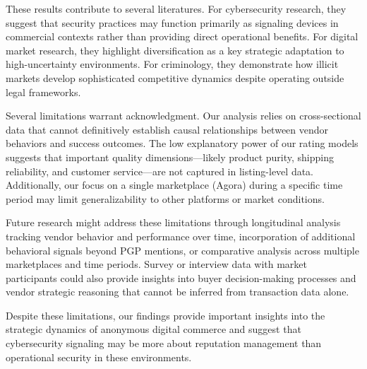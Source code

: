 \documentclass{article}
\begin{document}
These results contribute to several literatures. For cybersecurity research, they suggest that security practices may function primarily as signaling devices in commercial contexts rather than providing direct operational benefits. For digital market research, they highlight diversification as a key strategic adaptation to high-uncertainty environments. For criminology, they demonstrate how illicit markets develop sophisticated competitive dynamics despite operating outside legal frameworks.

Several limitations warrant acknowledgment. Our analysis relies on cross-sectional data that cannot definitively establish causal relationships between vendor behaviors and success outcomes. The low explanatory power of our rating models suggests that important quality dimensions—likely product purity, shipping reliability, and customer service—are not captured in listing-level data. Additionally, our focus on a single marketplace (Agora) during a specific time period may limit generalizability to other platforms or market conditions.

Future research might address these limitations through longitudinal analysis tracking vendor behavior and performance over time, incorporation of additional behavioral signals beyond PGP mentions, or comparative analysis across multiple marketplaces and time periods. Survey or interview data with market participants could also provide insights into buyer decision-making processes and vendor strategic reasoning that cannot be inferred from transaction data alone.

Despite these limitations, our findings provide important insights into the strategic dynamics of anonymous digital commerce and suggest that cybersecurity signaling may be more about reputation management than operational security in these environments.



\end{document}
